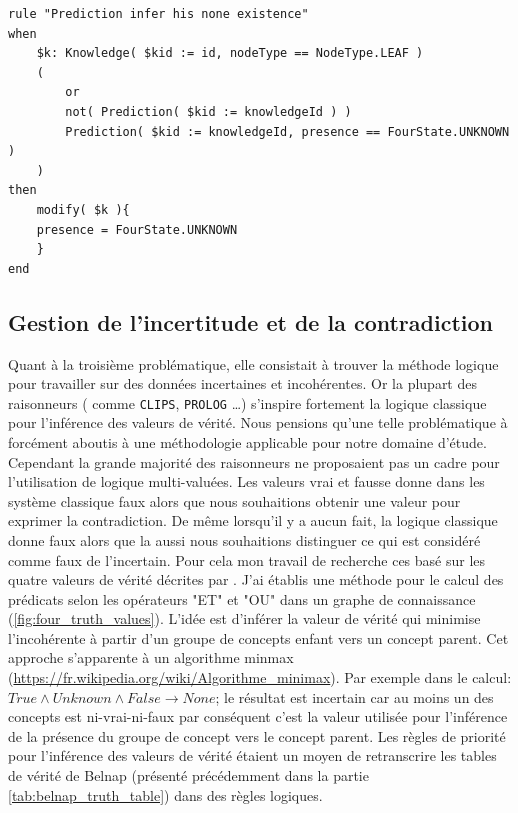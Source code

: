 \begin{refsegment}
\begin{lstlisting}[basicstyle=\tiny\normalfont\ttfamily,caption=Inférence de la prédiction d'absence]
rule "Prediction infer his none existence"
when
    $k: Knowledge( $kid := id, nodeType == NodeType.LEAF )
    (
        or
        not( Prediction( $kid := knowledgeId ) )
        Prediction( $kid := knowledgeId, presence == FourState.UNKNOWN )
    )
then
    modify( $k ){
    presence = FourState.UNKNOWN
    }
end
\end{lstlisting}

\subsection{Gestion de l'incertitude et de la contradiction}

Quant à la troisième problématique, elle consistait à trouver la méthode logique pour travailler sur des données incertaines et incohérentes. Or la plupart des raisonneurs ( comme \texttt{CLIPS}, \texttt{PROLOG} \ldots ) s'inspire fortement la logique classique pour l'inférence des valeurs de vérité. Nous pensions qu'une telle problématique à forcément aboutis à une méthodologie applicable pour notre domaine d'étude. Cependant la grande majorité des raisonneurs ne proposaient pas un cadre pour l'utilisation de logique multi-valuées. Les valeurs vrai et fausse donne dans les système classique faux alors que nous souhaitions obtenir une valeur pour exprimer la contradiction. De même lorsqu'il y a aucun fait, la logique classique donne faux alors que la aussi nous souhaitions distinguer ce qui est  considéré comme faux de l'incertain. Pour cela mon travail de recherche ces basé sur les quatre valeurs de vérité décrites par \citeauthor{belnap77}\cite{belnap77}. J'ai établis une méthode pour le calcul des prédicats selon les opérateurs "ET" et "OU" dans un graphe de connaissance (\cref{fig:four_truth_values}). L'idée est d'inférer la valeur de vérité qui minimise l'incohérente à partir  d'un groupe de concepts enfant vers un concept parent. Cet approche s'apparente à un algorithme minmax \cite{aho1989} (\url{https://fr.wikipedia.org/wiki/Algorithme_minimax}). Par exemple dans le calcul: $ True \land Unknown \land False \to None$; le résultat est incertain car au moins un des concepts est ni-vrai-ni-faux par conséquent c'est la valeur utilisée pour l'inférence de la présence du groupe de concept vers le concept parent. Les règles de priorité pour l'inférence des valeurs de vérité étaient un moyen de retranscrire les tables de vérité de Belnap (présenté précédemment dans la partie  \cref{tab:belnap_truth_table}) dans des règles logiques.


\end{refsegment}
